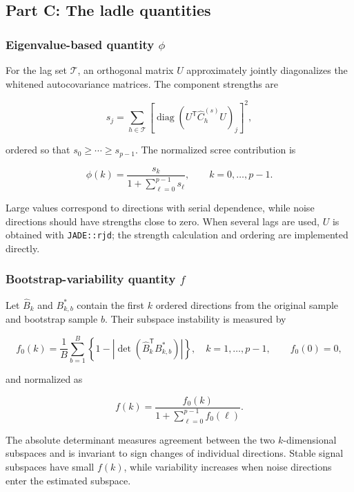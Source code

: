 \documentclass[
  11pt,
  a4paper,
]{article}
\begin{document}
\hypertarget{part-c-the-ladle-quantities}{%
\subsection{Part C: The ladle
quantities}\label{part-c-the-ladle-quantities}}

\hypertarget{eigenvalue-based-quantity-phi}{%
\subsubsection{\texorpdfstring{Eigenvalue-based quantity
\(\phi\)}{Eigenvalue-based quantity \textbackslash phi}}\label{eigenvalue-based-quantity-phi}}

For the lag set \(\mathcal T\), an orthogonal matrix \(U\) approximately
jointly diagonalizes the whitened autocovariance matrices. The component
strengths are

\[
s_j=\sum_{h\in\mathcal T}
\left[
\operatorname{diag}\!\left(U^{\mathsf T}\widehat C_h^{(s)}U\right)_j
\right]^2,
\]

ordered so that \(s_0\geq\cdots\geq s_{p-1}\). The normalized scree
contribution is

\[
\phi(k)=\frac{s_k}{1+\sum_{\ell=0}^{p-1}s_\ell},
\qquad k=0,\ldots,p-1.
\]

Large values correspond to directions with serial dependence, while
noise directions should have strengths close to zero. When several lags
are used, \(U\) is obtained with \texttt{JADE::rjd}; the strength
calculation and ordering are implemented directly.

\hypertarget{bootstrap-variability-quantity-f}{%
\subsubsection{\texorpdfstring{Bootstrap-variability quantity
\(f\)}{Bootstrap-variability quantity f}}\label{bootstrap-variability-quantity-f}}

Let \(\widehat B_k\) and \(B^*_{k,b}\) contain the first \(k\) ordered
directions from the original sample and bootstrap sample \(b\). Their
subspace instability is measured by

\[
f_0(k)=\frac{1}{B}\sum_{b=1}^{B}
\left\{1-\left|\det\!\left(\widehat B_k^{\mathsf T}B^*_{k,b}\right)\right|\right\},
\quad k=1,\ldots,p-1,
\qquad f_0(0)=0,
\]

and normalized as

\[
f(k)=\frac{f_0(k)}{1+\sum_{\ell=0}^{p-1}f_0(\ell)}.
\]

The absolute determinant measures agreement between the two
\(k\)-dimensional subspaces and is invariant to sign changes of
individual directions. Stable signal subspaces have small \(f(k)\),
while variability increases when noise directions enter the estimated
subspace.
\end{document}
